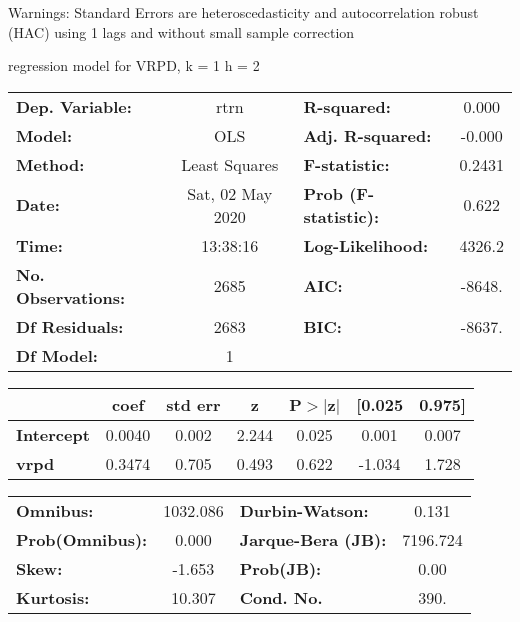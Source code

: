 Warnings: \newline
 [1] Standard Errors are heteroscedasticity and autocorrelation robust (HAC) using 1 lags and without small sample correction\ 

regression model for VRPD, k = 1 h = 2\begin{center}
\begin{tabular}{lclc}
\toprule
\textbf{Dep. Variable:}    &       rtrn       & \textbf{  R-squared:         } &     0.000   \\
\textbf{Model:}            &       OLS        & \textbf{  Adj. R-squared:    } &    -0.000   \\
\textbf{Method:}           &  Least Squares   & \textbf{  F-statistic:       } &    0.2431   \\
\textbf{Date:}             & Sat, 02 May 2020 & \textbf{  Prob (F-statistic):} &    0.622    \\
\textbf{Time:}             &     13:38:16     & \textbf{  Log-Likelihood:    } &    4326.2   \\
\textbf{No. Observations:} &        2685      & \textbf{  AIC:               } &    -8648.   \\
\textbf{Df Residuals:}     &        2683      & \textbf{  BIC:               } &    -8637.   \\
\textbf{Df Model:}         &           1      & \textbf{                     } &             \\
\bottomrule
\end{tabular}
\begin{tabular}{lcccccc}
                   & \textbf{coef} & \textbf{std err} & \textbf{z} & \textbf{P$> |$z$|$} & \textbf{[0.025} & \textbf{0.975]}  \\
\midrule
\textbf{Intercept} &       0.0040  &        0.002     &     2.244  &         0.025        &        0.001    &        0.007     \\
\textbf{vrpd}      &       0.3474  &        0.705     &     0.493  &         0.622        &       -1.034    &        1.728     \\
\bottomrule
\end{tabular}
\begin{tabular}{lclc}
\textbf{Omnibus:}       & 1032.086 & \textbf{  Durbin-Watson:     } &    0.131  \\
\textbf{Prob(Omnibus):} &   0.000  & \textbf{  Jarque-Bera (JB):  } & 7196.724  \\
\textbf{Skew:}          &  -1.653  & \textbf{  Prob(JB):          } &     0.00  \\
\textbf{Kurtosis:}      &  10.307  & \textbf{  Cond. No.          } &     390.  \\
\bottomrule
\end{tabular}
\end{center}

